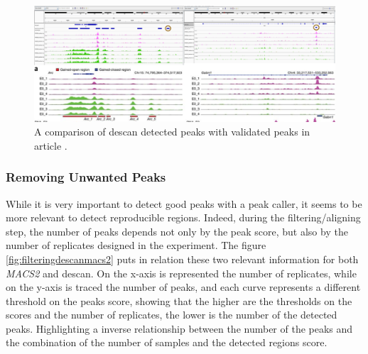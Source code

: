 \begin{figure}[H]
\includegraphics[width=\textwidth, keepaspectratio]{img/descan2/peaks.png}
\caption[\gls{descan} peaks detection]{A comparison of \gls{descan} detected peaks with validated peaks in article \cite{Su2017}.}
\label{fig:peaksdescan}
\centering
\end{figure}

\subsubsection{Removing Unwanted Peaks}

While it is very important to detect good peaks with a peak caller, it seems to be more relevant to detect reproducible regions. 
Indeed, during the filtering/aligning step, the number of peaks depends not only by the peak score, but also by the number of replicates designed in the experiment.
The figure \ref{fig:filteringdescanmacs2} puts in relation these two relevant information for both \textit{MACS2} and \gls{descan}. 
On the x-axis is represented the number of replicates, while on the y-axis is traced the number of peaks, and each curve represents a different threshold on the peaks score, showing that the higher are the thresholds on the scores and the number of replicates, the lower is the number of the detected peaks.
Highlighting a inverse relationship between the number of the peaks and the combination of the number of samples and the detected regions score.

